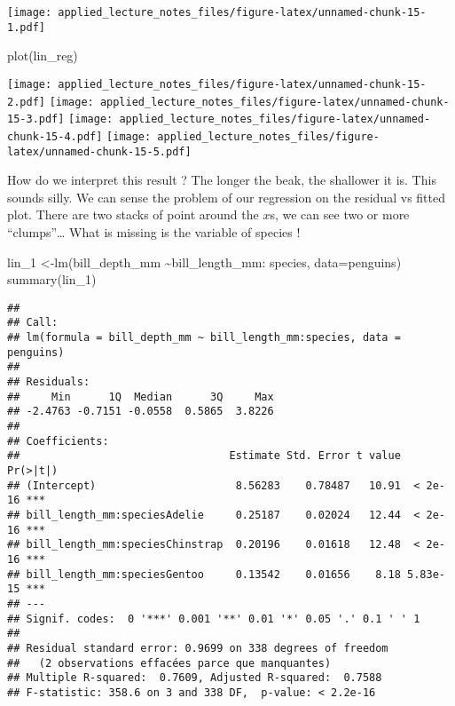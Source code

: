 \documentclass[
]{article}
\newenvironment{Shaded}{\begin{snugshade}}{\end{snugshade}}
\newcommand{\AttributeTok}[1]{\textcolor[rgb]{0.77,0.63,0.00}{#1}}
\newcommand{\FunctionTok}[1]{\textcolor[rgb]{0.00,0.00,0.00}{#1}}
\newcommand{\NormalTok}[1]{#1}
\newcommand{\OtherTok}[1]{\textcolor[rgb]{0.56,0.35,0.01}{#1}}
\newcommand{\SpecialCharTok}[1]{\textcolor[rgb]{0.00,0.00,0.00}{#1}}
\begin{document}
\texttt{[image: applied\_lecture\_notes\_files/figure-latex/unnamed-chunk-15-1.pdf]}

\begin{Shaded}
\begin{Highlighting}[]
\FunctionTok{plot}\NormalTok{(lin\_reg)}
\end{Highlighting}
\end{Shaded}

\texttt{[image: applied\_lecture\_notes\_files/figure-latex/unnamed-chunk-15-2.pdf]}
\texttt{[image: applied\_lecture\_notes\_files/figure-latex/unnamed-chunk-15-3.pdf]}
\texttt{[image: applied\_lecture\_notes\_files/figure-latex/unnamed-chunk-15-4.pdf]}
\texttt{[image: applied\_lecture\_notes\_files/figure-latex/unnamed-chunk-15-5.pdf]}

How do we interpret this result ? The longer the beak, the shallower it
is. This sounds silly. We can sense the problem of our regression on the
residual vs fitted plot. There are two stacks of point around the
\(x\)s, we can see two or more ``clumps''\ldots{} What is missing is the
variable of species !

\begin{Shaded}
\begin{Highlighting}[]
\NormalTok{lin\_1 }\OtherTok{\textless{}{-}}\FunctionTok{lm}\NormalTok{(bill\_depth\_mm }\SpecialCharTok{\textasciitilde{}}\NormalTok{bill\_length\_mm}\SpecialCharTok{:}\NormalTok{ species, }\AttributeTok{data=}\NormalTok{penguins)}
\FunctionTok{summary}\NormalTok{(lin\_1)}
\end{Highlighting}
\end{Shaded}

\begin{verbatim}
## 
## Call:
## lm(formula = bill_depth_mm ~ bill_length_mm:species, data = penguins)
## 
## Residuals:
##     Min      1Q  Median      3Q     Max 
## -2.4763 -0.7151 -0.0558  0.5865  3.8226 
## 
## Coefficients:
##                                 Estimate Std. Error t value Pr(>|t|)    
## (Intercept)                      8.56283    0.78487   10.91  < 2e-16 ***
## bill_length_mm:speciesAdelie     0.25187    0.02024   12.44  < 2e-16 ***
## bill_length_mm:speciesChinstrap  0.20196    0.01618   12.48  < 2e-16 ***
## bill_length_mm:speciesGentoo     0.13542    0.01656    8.18 5.83e-15 ***
## ---
## Signif. codes:  0 '***' 0.001 '**' 0.01 '*' 0.05 '.' 0.1 ' ' 1
## 
## Residual standard error: 0.9699 on 338 degrees of freedom
##   (2 observations effacées parce que manquantes)
## Multiple R-squared:  0.7609, Adjusted R-squared:  0.7588 
## F-statistic: 358.6 on 3 and 338 DF,  p-value: < 2.2e-16
\end{verbatim}
\end{document}
